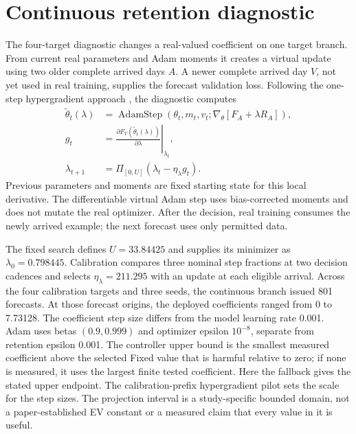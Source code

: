 \chapter{Continuous retention diagnostic}\label{app:continuous}
The four-target diagnostic changes a real-valued coefficient on one target branch. From current real parameters and Adam moments it creates a virtual update using two older complete arrived days $A$. A newer complete arrived day $V$, not yet used in real training, supplies the forecast validation loss. Following the one-step hypergradient approach \cite{luketina2016}, the diagnostic computes
\begin{equation}\begin{aligned}
\widetilde\theta_t(\lambda)&=\operatorname{AdamStep}
\left(\theta_t,m_t,v_t;\nabla_\theta[F_A+\lambda R_A]\right),\\
g_t&=\left.\frac{\partial F_V(\widetilde\theta_t(\lambda))}
{\partial\lambda}\right|_{\lambda_t},\\
\lambda_{t+1}&=\Pi_{[0,U]}\left(\lambda_t-\eta_\lambda g_t\right).
\end{aligned}\label{eq:hypergradient}\end{equation}
Previous parameters and moments are fixed starting state for this local derivative. The differentiable virtual Adam step uses bias-corrected moments and does not mutate the real optimizer. After the decision, real training consumes the newly arrived example; the next forecast uses only permitted data.

The fixed search defines $U=33.84425$ and supplies its minimizer as $\lambda_0=0.798445$. Calibration compares three nominal step fractions at two decision cadences and selects $\eta_\lambda=211.295$ with an update at each eligible arrival. Across the four calibration targets and three seeds, the continuous branch issued 801 forecasts. At those forecast origins, the deployed coefficients ranged from 0 to 7.73128. The coefficient step size differs from the model learning rate 0.001. Adam uses betas $(0.9,0.999)$ and optimizer epsilon $10^{-8}$, separate from retention epsilon 0.001. The controller upper bound is the smallest measured coefficient above the selected Fixed value that is harmful relative to zero; if none is measured, it uses the largest finite tested coefficient. Here the fallback gives the stated upper endpoint. The calibration-prefix hypergradient pilot sets the scale for the step sizes. The projection interval is a study-specific bounded domain, not a paper-established EV constant or a measured claim that every value in it is useful.

